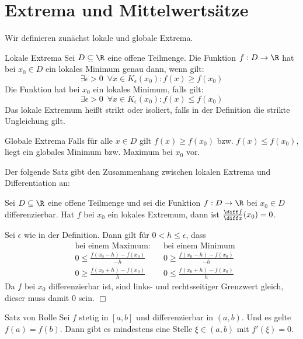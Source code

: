 \section{Extrema und Mittelwertsätze}
Wir definieren zunächst lokale und globale Extrema.

\begin{definition}{Lokale Extrema}
	Sei $D\subseteq\R$ eine offene Teilmenge.
	Die Funktion $f:D\rightarrow\R$ hat bei $x_0\in D$ ein lokales Minimum genau dann, wenn gilt:
	\begin{equation*}
		\exists \epsilon>0 \enspace\forall x\in K_\epsilon(x_0):f(x)\geq f(x_0)
	\end{equation*}
	Die Funktion hat bei $x_0$ ein lokales Minimum, falls gilt:
	\begin{equation*}
		\exists \epsilon>0 \enspace\forall x\in K_\epsilon(x_0):f(x)\leq f(x_0)
	\end{equation*}
	Das lokale Extremum heißt strikt oder isoliert, falls in der Definition die strikte Ungleichung gilt.
\end{definition}
\begin{definition}{Globale Extrema}
	Falls für alle $x\in D$ gilt $f(x)\geq f(x_0)$ bzw. $f(x)\leq f(x_0)$, liegt ein globales Minimum bzw. Maximum bei $x_0$ vor.
\end{definition}

Der folgende Satz gibt den Zusammenhang zwischen lokalen Extrema und Differentiation an:
\begin{satz}{}
	Sei $D\subseteq\R$ eine offene Teilmenge und sei die Funktion $f:D\rightarrow\R$ bei $x_0\in D$ differenzierbar. Hat $f$ bei $x_0$ ein lokales Extremum, dann ist $\frac{\diff f}{\diff x}(x_0)=0$.
\end{satz}
\begin{beweis}
	Sei $\epsilon$ wie in der Definition. Dann gilt für $0<h\leq\epsilon$, dass
	\begin{align*}
		&\text{bei einem Maximum:} &&\text{bei einem Minimum}\\
		&0\leq\frac{f(x_0-h)-f(x_0)}{-h} &&0\geq\frac{f(x_0-h)-f(x_0)}{-h}\\
		&0\geq\frac{f(x_0+h)-f(x_0)}{h} &&0\leq\frac{f(x_0+h)-f(x_0)}{h}
	\end{align*}
	Da $f$ bei $x_0$ differenzierbar ist, sind links- und rechtsseitiger Grenzwert gleich, dieser muss damit $0$ sein.
	\hfill$\Box$
\end{beweis}

\begin{satz}{Satz von Rolle}
Sei $f$ stetig in $[a,b]$ und differenzierbar in $(a,b)$. Und es gelte $f(a)=f(b)$. Dann gibt es mindestens eine Stelle $\xi \in(a,b)$ mit $f'(\xi)=0$.
\end{satz}

